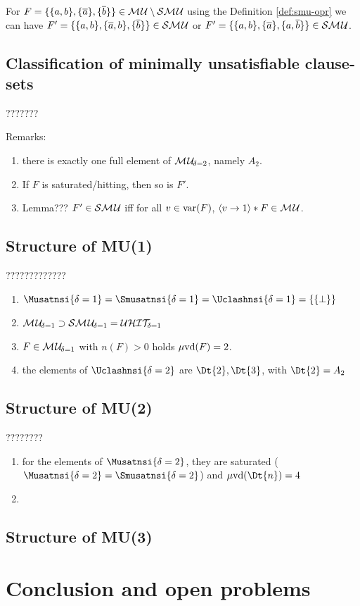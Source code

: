 \documentclass{report}
\begin{document}
\begin{examp}\label{exp:smu-exp}
  For $F = \{ \{ a,b \},\{ \overline{a} \},\{ \overline{b} \} \} \in \mathcal{M\hspace{0.8pt}U} \setminus \mathcal{S}\mathcal{M\hspace{0.8pt}U}$ using the Definition \ref{def:smu-opr} we can have $F'=\{ \{ a,b \},\{ \overline{a},b \},\{ \overline{b} \} \} \in \mathcal{S}\mathcal{M\hspace{0.8pt}U}$ or $F'=\{ \{ a,b \},\{ \overline{a} \},\{ a,\overline{b} \} \} \in \mathcal{S}\mathcal{M\hspace{0.8pt}U}$.
\end{examp}

\section{Classification of minimally unsatisfiable clause-sets}
\label{sec:c-mucls}

???????

Remarks:
  \begin{enumerate}
  \item there is exactly one full element of $\mathcal{M\hspace{0.8pt}U}_{\!\delta=2}$, namely $A_2$.
  \item If $F$ is saturated/hitting, then so is $F'$.
  \item Lemma???  $F' \in \mathcal{S}\mathcal{M\hspace{0.8pt}U}$ iff for all $v \in \operatorname{var}(F)$, $\langle v \rightarrow 1 \rangle*F \in \mathcal{M\hspace{0.8pt}U}$.
  \end{enumerate} 
  
\section{Structure of MU(1)}
\label{sec:smu1}

?????????????
  \begin{enumerate}
  \item $\Musatnsi{\delta=1} = \Smusatnsi{\delta=1} = \Uclashnsi{\delta=1} = \set{\set{\bot}}$ 
  \item $\mathcal{M\hspace{0.8pt}U}_{\!\delta=1} \supset \mathcal{S}\mathcal{M\hspace{0.8pt}U}_{\!\delta=1} = \mathcal{U}\mathcal{HIT}_{\!\!\delta=1}$
  \item $F \in \mathcal{M\hspace{0.8pt}U}_{\!\delta=1}$ with $n(F) > 0$ holds $\operatorname{\mu\!\operatorname{vd}}(F) = 2$.
  \item the elements of $\Uclashnsi{\delta=2}$ are $\Dt{2}, \Dt{3}$, with $\Dt{2} = A_2$
  \end{enumerate} 

\section{Structure of MU(2)}
\label{sec:smu2}

????????
  \begin{enumerate}
  \item for the elements of $\Musatnsi{\delta=2}$, they are saturated ($\Musatnsi{\delta=2} = \Smusatnsi{\delta=2}$) and $\minvdeg(\Dt{n}) = 4$
  \item 
  \end{enumerate}


\section{Structure of MU(3)}
\label{sec:smu3}
\chapter{Conclusion and open problems}
\label{cha:concl}

\newpage


\end{document}
